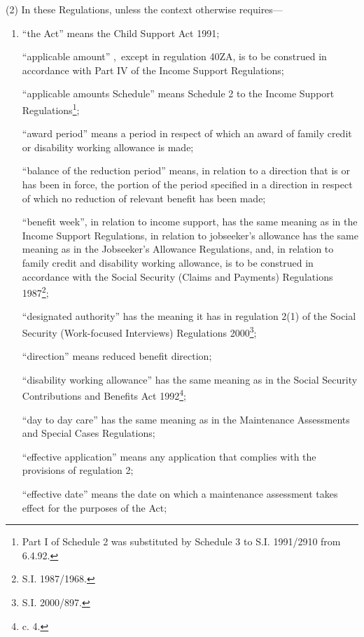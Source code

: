 \documentclass[a4paper,12pt]{article}
\begin{document}
(2) In these Regulations, unless the context otherwise requires—
\begin{enumerate}\item[]
“the Act” means the Child Support Act 1991;

“applicable amount”%
,~except in regulation 40ZA,  %
 is to be construed in accordance with Part IV of the Income Support Regulations;

“applicable amounts Schedule” means Schedule 2 to the Income Support Regulations\footnote{\frenchspacing Part I of Schedule 2 was substituted by Schedule 3 to S.I. 1991/2910 from 6.4.92.};

“award period” means a period in respect of which an award of family credit or disability working allowance is made;

“balance of the reduction period” means, in relation to a direction that is or has been in force, the portion of the period specified in a direction in respect of which no reduction of relevant benefit has been made;

“benefit week”, in relation to income support, has the same meaning as in the Income Support Regulations, 
in relation to jobseeker’s allowance has the same meaning as in the Jobseeker’s Allowance Regulations,  %
and, in relation to family credit and disability working allowance, is to be construed in accordance with the Social Security (Claims and Payments) Regulations 1987\footnote{\frenchspacing S.I. 1987/1968.};

“designated authority” has the meaning it has in regulation 2(1) of the Social Security (Work-focused Interviews) Regulations 2000\footnote{\frenchspacing S.I. 2000/897.};

“direction” means reduced benefit direction;

“disability working allowance” has the same meaning as in the Social Security Contributions and Benefits Act 1992\footnote{ c. 4.};

“day to day care” has the same meaning as in the Maintenance Assessments and Special Cases Regulations;

“effective application” means any application that complies with the provisions of regulation 2;

“effective date” means the date on which a maintenance assessment takes effect for the purposes of the Act;


\end{enumerate}
\end{document}
